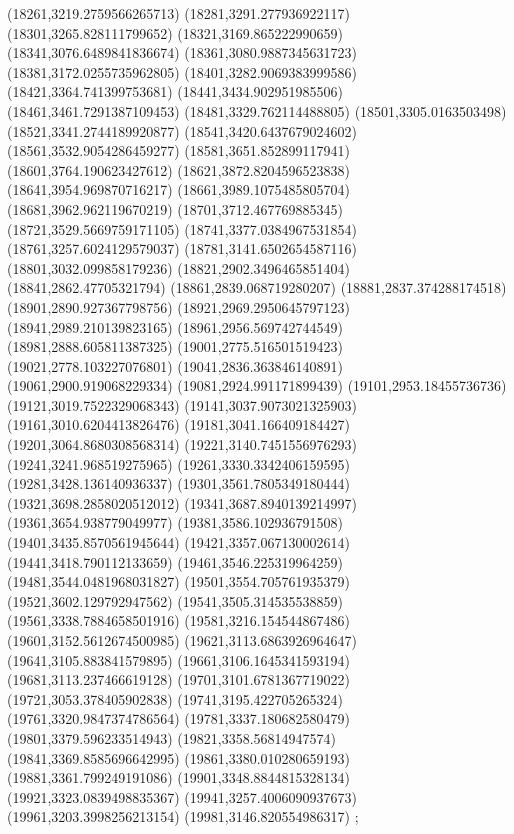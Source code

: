 {(18261,3219.2759566265713)
(18281,3291.277936922117)
(18301,3265.828111799652)
(18321,3169.865222990659)
(18341,3076.6489841836674)
(18361,3080.9887345631723)
(18381,3172.0255735962805)
(18401,3282.9069383999586)
(18421,3364.741399753681)
(18441,3434.902951985506)
(18461,3461.7291387109453)
(18481,3329.762114488805)
(18501,3305.0163503498)
(18521,3341.2744189920877)
(18541,3420.6437679024602)
(18561,3532.9054286459277)
(18581,3651.852899117941)
(18601,3764.190623427612)
(18621,3872.8204596523838)
(18641,3954.969870716217)
(18661,3989.1075485805704)
(18681,3962.962119670219)
(18701,3712.467769885345)
(18721,3529.5669759171105)
(18741,3377.0384967531854)
(18761,3257.6024129579037)
(18781,3141.6502654587116)
(18801,3032.099858179236)
(18821,2902.3496465851404)
(18841,2862.47705321794)
(18861,2839.068719280207)
(18881,2837.374288174518)
(18901,2890.927367798756)
(18921,2969.2950645797123)
(18941,2989.210139823165)
(18961,2956.569742744549)
(18981,2888.605811387325)
(19001,2775.516501519423)
(19021,2778.103227076801)
(19041,2836.363846140891)
(19061,2900.919068229334)
(19081,2924.991171899439)
(19101,2953.18455736736)
(19121,3019.7522329068343)
(19141,3037.9073021325903)
(19161,3010.6204413826476)
(19181,3041.166409184427)
(19201,3064.8680308568314)
(19221,3140.7451556976293)
(19241,3241.968519275965)
(19261,3330.3342406159595)
(19281,3428.136140936337)
(19301,3561.7805349180444)
(19321,3698.2858020512012)
(19341,3687.8940139214997)
(19361,3654.938779049977)
(19381,3586.102936791508)
(19401,3435.8570561945644)
(19421,3357.067130002614)
(19441,3418.790112133659)
(19461,3546.225319964259)
(19481,3544.0481968031827)
(19501,3554.705761935379)
(19521,3602.129792947562)
(19541,3505.314535538859)
(19561,3338.7884658501916)
(19581,3216.154544867486)
(19601,3152.5612674500985)
(19621,3113.6863926964647)
(19641,3105.883841579895)
(19661,3106.1645341593194)
(19681,3113.237466619128)
(19701,3101.6781367719022)
(19721,3053.378405902838)
(19741,3195.422705265324)
(19761,3320.9847374786564)
(19781,3337.180682580479)
(19801,3379.596233514943)
(19821,3358.56814947574)
(19841,3369.8585696642995)
(19861,3380.010280659193)
(19881,3361.799249191086)
(19901,3348.8844815328134)
(19921,3323.0839498835367)
(19941,3257.4006090937673)
(19961,3203.3998256213154)
(19981,3146.820554986317)
};
